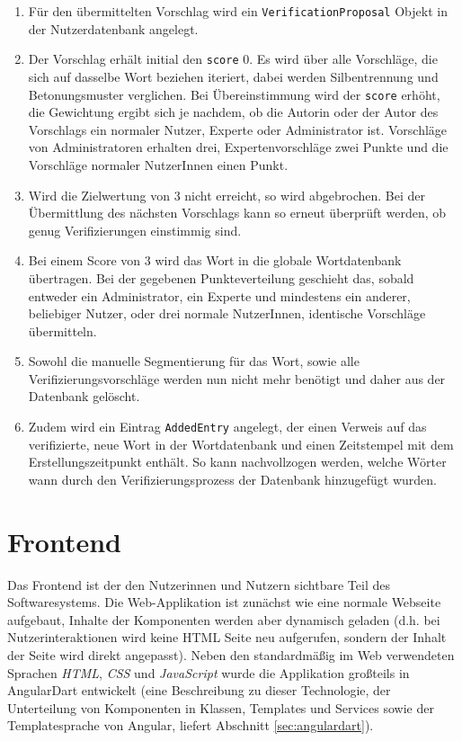 \begin{enumerate}
	\item Für den übermittelten Vorschlag wird ein \texttt{VerificationProposal} Objekt in der Nutzerdatenbank angelegt.
	
	\item Der Vorschlag erhält initial den \texttt{score} $0$. Es wird über alle Vorschläge, die sich auf dasselbe Wort beziehen iteriert, dabei werden Silbentrennung und Betonungsmuster verglichen. Bei Übereinstimmung wird der \texttt{score} erhöht, die Gewichtung ergibt sich je nachdem, ob die Autorin oder der Autor des Vorschlags ein normaler Nutzer, Experte oder Administrator ist. Vorschläge von Administratoren erhalten drei, Expertenvorschläge zwei Punkte und die Vorschläge normaler NutzerInnen einen Punkt.
	
	\item Wird die Zielwertung von $3$ nicht erreicht, so wird abgebrochen. Bei der Übermittlung des nächsten Vorschlags kann so erneut überprüft werden, ob genug Verifizierungen einstimmig sind.
	
	\item Bei einem Score von $3$ wird das Wort in die globale Wortdatenbank übertragen. Bei der gegebenen Punkteverteilung geschieht das, sobald entweder ein Administrator, ein Experte und mindestens ein anderer, beliebiger Nutzer, oder drei normale NutzerInnen, identische Vorschläge übermitteln.
	
	\item Sowohl die manuelle Segmentierung für das Wort, sowie alle Verifizierungsvorschläge werden nun nicht mehr benötigt und daher aus der Datenbank gelöscht.
	
	\item Zudem wird ein Eintrag \texttt{AddedEntry} angelegt, der einen Verweis auf das verifizierte, neue Wort in der Wortdatenbank und einen Zeitstempel mit dem Erstellungszeitpunkt enthält. So kann nachvollzogen werden, welche Wörter wann durch den Verifizierungsprozess der Datenbank hinzugefügt wurden.
\end{enumerate}









\section{Frontend}

Das Frontend ist der den Nutzerinnen und Nutzern sichtbare Teil des Softwaresystems. Die Web-Applikation ist zunächst wie eine normale Webseite aufgebaut, Inhalte der Komponenten werden aber dynamisch geladen (d.h. bei Nutzerinteraktionen wird keine HTML Seite neu aufgerufen, sondern der Inhalt der Seite wird direkt angepasst). Neben den standardmäßig im Web verwendeten Sprachen \textit{HTML}, \textit{CSS} und \textit{JavaScript} wurde die Applikation großteils in AngularDart entwickelt (eine Beschreibung zu dieser Technologie, der Unterteilung von Komponenten in Klassen, Templates und Services sowie der Templatesprache von Angular, liefert Abschnitt \ref{sec:angulardart}).\\

